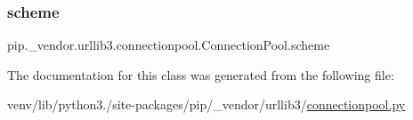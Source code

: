 \subsubsection{\texorpdfstring{scheme}{scheme}}
{\footnotesize\ttfamily pip.\+\_\+vendor.\+urllib3.\+connectionpool.\+Connection\+Pool.\+scheme\hspace{0.3cm}{\ttfamily [static]}}



The documentation for this class was generated from the following file\+:\begin{DoxyCompactItemize}
\item 
venv/lib/python3./site-\/packages/pip/\+\_\+vendor/urllib3/\hyperlink{connectionpool_8py}{connectionpool.\+py}\end{DoxyCompactItemize}
